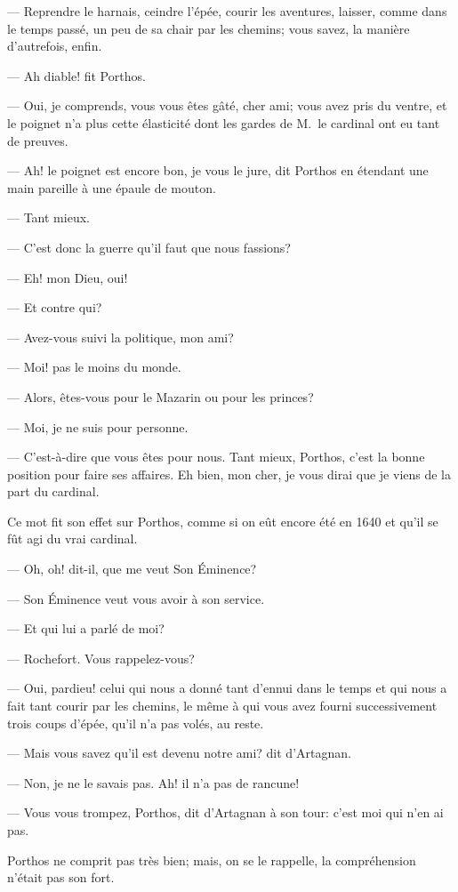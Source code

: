 — Reprendre le harnais, ceindre l'épée, courir les aventures, laisser, comme dans le temps passé, un peu de sa chair par les chemins; vous savez, la manière d'autrefois, enfin.

— Ah diable! fit Porthos.

— Oui, je comprends, vous vous êtes gâté, cher ami; vous avez pris du ventre, et le poignet n'a plus cette élasticité dont les gardes de M.~le cardinal ont eu tant de preuves.

— Ah! le poignet est encore bon, je vous le jure, dit Porthos en étendant une main pareille à une épaule de mouton.

— Tant mieux.

— C'est donc la guerre qu'il faut que nous fassions?

— Eh! mon Dieu, oui!

— Et contre qui?

— Avez-vous suivi la politique, mon ami?

— Moi! pas le moins du monde.

— Alors, êtes-vous pour le Mazarin ou pour les princes?

— Moi, je ne suis pour personne.

— C'est-à-dire que vous êtes pour nous. Tant mieux, Porthos, c'est la bonne position pour faire ses affaires. Eh bien, mon cher, je vous dirai que je viens de la part du cardinal.

Ce mot fit son effet sur Porthos, comme si on eût encore été en 1640 et qu'il se fût agi du vrai cardinal.

— Oh, oh! dit-il, que me veut Son Éminence?

— Son Éminence veut vous avoir à son service.

— Et qui lui a parlé de moi?

— Rochefort. Vous rappelez-vous?

— Oui, pardieu! celui qui nous a donné tant d'ennui dans le temps et qui nous a fait tant courir par les chemins, le même à qui vous avez fourni successivement trois coups d'épée, qu'il n'a pas volés, au reste.

— Mais vous savez qu'il est devenu notre ami? dit d'Artagnan.

— Non, je ne le savais pas. Ah! il n'a pas de rancune!

— Vous vous trompez, Porthos, dit d'Artagnan à son tour: c'est moi qui n'en ai pas.

Porthos ne comprit pas très bien; mais, on se le rappelle, la compréhension n'était pas son fort.

